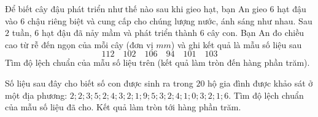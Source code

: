 \begin{bt}%
	Để biết cây đậu phát triển như thế nào sau khi gieo hạt, bạn An gieo $6$ hạt đậu vào $6$ chậu riêng biệt và cung cấp cho chúng lượng nước, ánh sáng như nhau. Sau $2$ tuần, $6$ hạt đậu đã nảy mầm và phát triển thành $6$ cây con. Bạn An đo chiều cao từ rễ đến ngọn của mỗi cây (đơn vị $mm$) và ghi kết quả là mẫu số liệu sau
	\[ 112 \quad 102 \quad 106 \quad 94 \quad 101\quad103 \]
	Tìm độ lệch chuẩn của mẫu số liệu trên (kết quả làm tròn đến hàng phần trăm).
\end{bt}

\begin{bt}%
Số liệu sau đây cho biết số con được sinh ra trong $20$ hộ gia đình được khảo sát ở một địa phương: 
$2;2;3;5;2;4;3;2;1;9;5;3;2;4;1;0;3;2;1;6$. Tìm độ lệch chuẩn của mẫu số liệu đã cho. Kết quả làm tròn tới hàng phần trăm.
\end{bt}

